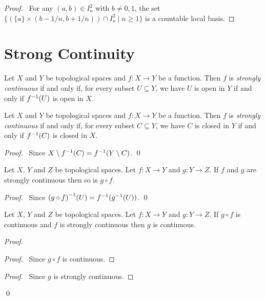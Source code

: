 \begin{proof}
    \pf\ For any $(a,b) \in I_o^2$ with $b \neq 0,1$, the set $\{ (\{a\} \times (b - 1/n,b + 1/n)) \cap I_o^2 \mid n \geq 1 \}$ is a countable local basis.
\end{proof}

\section{Strong Continuity}

\begin{definition}
    Let $X$ and $Y$ be topological spaces and $f : X \rightarrow Y$ be a function. Then $f$ is \emph{strongly continuous} if and only if, for every subset $U \subseteq Y$,
    we have $U$ is open in $Y$ if and only if ${f}^{-1}(U)$ is open in $X$.
\end{definition}

\begin{proposition}
    Let $X$ and $Y$ be topological spaces and $f : X \rightarrow Y$ be a function. Then $f$ is \emph{strongly continuous} if and only if, for every subset $C \subseteq Y$,
    we have $C$ is closed in $Y$ if and only if ${f}^{-1}(C)$ is closed in $X$.
\end{proposition}

\begin{proof}
    \pf\ Since $X \setminus {f}^{-1}(C) = {f}^{-1}(Y \setminus C)$. \qed
\end{proof}

\begin{proposition}
    \label{proposition:strongly_continuous_composite}
    Let $X$, $Y$ and $Z$ be topological spaces. Let $f : X \rightarrow Y$ and $g : Y \rightarrow Z$. If $f$ and $g$ are strongly continuous then so is $g \circ f$.
\end{proposition}

\begin{proof}
    \pf\ Since ${(g \circ f)}^{-1}(U) = {f}^{-1}({g}^{-1}(U))$. \qed
\end{proof}

\begin{proposition}
    \label{proposition:continuous_strongly_continuous}
    Let $X$, $Y$ and $Z$ be topological spaces.
    Let $f : X \rightarrow Y$ and $g : Y \rightarrow Z$.
    If $g \circ f$ is continuous and $f$ is strongly continuous then 
    $g$ is continuous.
\end{proposition}

\begin{proof}
    \pf
    \begin{proof}
        \pf\ Since $g \circ f$ is continuous.
    \end{proof}
    \begin{proof}
        \pf\ Since $g$ is strongly continuous.
    \end{proof}
    \qed
\end{proof}

